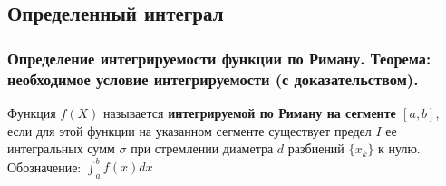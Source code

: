 \documentclass[10pt]{article}
\begin{document}



    \subsection{Определенный интеграл}
    \subsubsection{Определение интегрируемости функции по Риману. Теорема: необходимое условие интегрируемости (с доказательством).}
    \begin{definition}
        Функция $f(X)$ называется \textbf{интегрируемой по Риману на сегменте $[a, b]$}, если для этой функции на указанном сегменте существует предел $I$ ее интегральных сумм $\sigma$ при стремлении диаметра $d$ разбиений $\{x_k\}$ к нулю. Обозначение: $\int_a^b f(x)dx$
    \end{definition}
\end{document}
